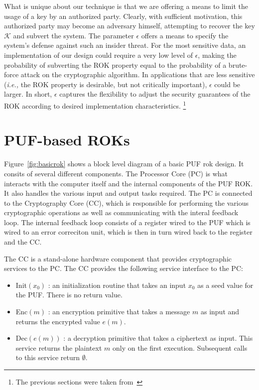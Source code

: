 What is unique about our technique is that we are offering a means to limit the usage of a key by an authorized
party.  Clearly, with sufficient motivation, this authorized party may become an adversary himself, attempting to
recover the key $\mathcal{K}$ and subvert the system.  The parameter $\epsilon$ offers a means to specify the system's
defense against such an insider threat.  For the most sensitive data, an implementation of our design could require
a very low level of $\epsilon$, making the probability of subverting the ROK property equal to the probability of
a brute-force attack on the cryptographic algorithm.  In applications that are less sensitive (\emph{i.e.,} the
ROK property is desirable, but not critically important), $\epsilon$ could be larger.  In short, $\epsilon$ captures the
flexibility to adjust the security guarantees of the ROK according to desired implementation characteristics.
\footnote{The previous sections were taken from~\cite{PUFROK}}

\section{PUF-based ROKs}
Figure~\ref{fig:basicrok} shows a block level diagram of a basic PUF rok design. It consits of several different
components. The Processor Core (PC) is what interacts with the computer itself and the internal components of the
PUF ROK. It also handles the various input and output tasks required.
 The PC is connected to the Cryptography Core (CC), which is responsible for performing the various
cryptographic operations as well as communicating with the interal feedback loop.
The internal feedback loop consists of a register wired to the PUF which is wired to an error correciton unit, which
is then in turn wired back to the register and the CC.

The CC is a stand-alone hardware component that provides cryptographic services to the PC.  The CC provides the 
following service interface to the PC:
\begin{itemize}
\item {\sf Init}$(x_0)$ : an initialization routine that takes an input $x_0$ as a seed value for the PUF.  There is no return value.
\item {\sf Enc}$(m)$ : an encryption primitive that takes a message $m$ as input and returns the encrypted value $e(m)$.
\item {\sf Dec}$(e(m))$ : a decryption primitive that takes a ciphertext as input.  This service returns the plaintext $m$ only
on the first execution.  Subsequent calls to this service return $\emptyset$.
\end{itemize}

